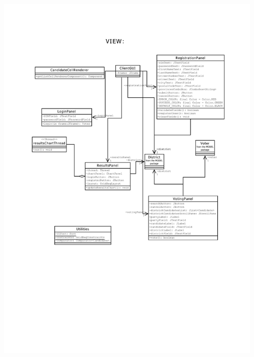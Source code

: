 \documentclass[11pt,english]{article}
\begin{document}
\includegraphics[width=6.2in]{figures/uml3.pdf} \\
\end{document}
